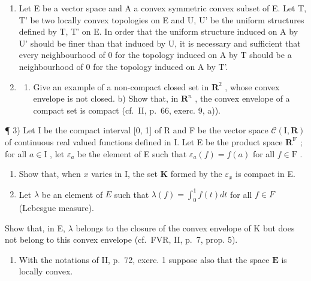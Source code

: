 \exercisegroup

\begin{enumerate}
\def\labelenumi{\arabic{enumi})}
\item
  Let E be a vector space and A a convex symmetric convex subset of E. Let T, T' be two locally convex topologies on E and U, U' be the uniform structures defined by T, T' on E. In order that the uniform structure induced on A by U' should be finer than that induced by U, it is necessary and sufficient that every neighbourhood of 0 for the topology induced on A by T should be a neighbourhood of 0 for the topology induced on A by T'.
\item
  \begin{enumerate}
  \def\labelenumii{\alph{enumii})}
  \tightlist
  \item
    Give an example of a non-compact closed set in \(\mathbf{R}^2\) , whose convex envelope is not closed. b) Show that, in \(\mathbf{R}^n\) , the convex envelope of a compact set is compact (cf.~II, p.~66, exerc. 9, a)).
  \end{enumerate}
\end{enumerate}

¶ 3) Let I be the compact interval {[}0, 1{]} of R and F be the vector space \(\mathcal{C}(\mathrm{I},\mathbf{R})\) of continuous real valued functions defined in I. Let E be the product space \(\mathbf{R}^{\mathbf{F}}\) ; for all \(a\in\mathrm{I}\) , let \(\varepsilon_{a}\) be the element of E such that \(\varepsilon_{a}(f)=f(a)\) for all \(f\in\mathrm{F}\) .

\begin{enumerate}
\def\labelenumi{\alph{enumi})}
\item
  Show that, when \(x\) varies in I, the set \(\mathbf{K}\) formed by the \(\varepsilon_x\) is compact in E.
\item
  Let \(\lambda\) be an element of \(E\) such that \(\lambda(f) = \int_0^1 f(t)dt\) for all \(f\in F\) (Lebesgue measure).
\end{enumerate}

Show that, in E, \(\lambda\) belongs to the closure of the convex envelope of K but does not belong to this convex envelope (cf.~FVR, II, p.~7, prop. 5).

\begin{enumerate}
\def\labelenumi{\arabic{enumi})}
\setcounter{enumi}{3}
\tightlist
\item
  With the notations of II, p.~72, exerc. 1 suppose also that the space \(\mathbf{E}\) is locally convex.
\end{enumerate}

